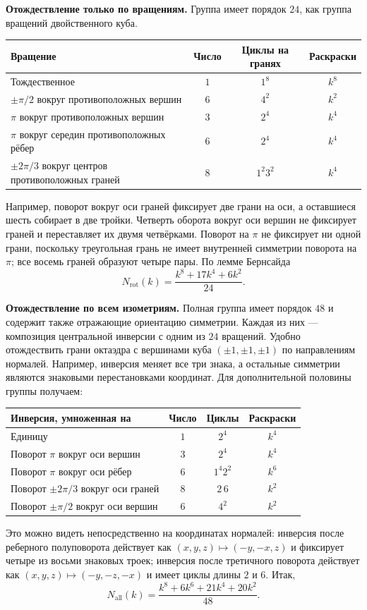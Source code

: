 \textbf{Отождествление только по вращениям.}
Группа имеет порядок $24$, как группа вращений двойственного куба.
\begin{center}
\small\setlength{\tabcolsep}{4pt}
\begin{tabular}{l|c|c|c}
Вращение & Число & Циклы на гранях & Раскраски\\\hline
Тождественное & $1$ & $1^8$ & $k^8$\\
$\pm\pi/2$ вокруг противоположных вершин & $6$ & $4^2$ & $k^2$\\
$\pi$ вокруг противоположных вершин & $3$ & $2^4$ & $k^4$\\
$\pi$ вокруг середин противоположных рёбер & $6$ & $2^4$ & $k^4$\\
$\pm2\pi/3$ вокруг центров противоположных граней & $8$ & $1^2 3^2$ & $k^4$
\end{tabular}
\end{center}
Например, поворот вокруг оси граней фиксирует две грани на оси,
а оставшиеся шесть собирает в две тройки.
Четверть оборота вокруг оси вершин не фиксирует граней и
переставляет их двумя четвёрками.
Поворот на $\pi$ не фиксирует ни одной грани, поскольку
треугольная грань не имеет внутренней симметрии поворота на $\pi$;
все восемь граней образуют четыре пары.
По лемме Бернсайда
\[\boxed{N_{\mathrm{rot}}(k)=\frac{k^8+17k^4+6k^2}{24}.}\]

\textbf{Отождествление по всем изометриям.}
Полная группа имеет порядок $48$ и содержит также отражающие
ориентацию симметрии. Каждая из них --- композиция центральной
инверсии с одним из $24$ вращений.
Удобно отождествить грани октаэдра с вершинами куба
$(\pm1,\pm1,\pm1)$ по направлениям нормалей.
Например, инверсия меняет все три знака, а остальные симметрии
являются знаковыми перестановками координат.
Для дополнительной половины группы получаем:
\begin{center}
\small\setlength{\tabcolsep}{4pt}
\begin{tabular}{l|c|c|c}
Инверсия, умноженная на & Число & Циклы & Раскраски\\\hline
Единицу & $1$ & $2^4$ & $k^4$\\
Поворот $\pi$ вокруг оси вершин & $3$ & $2^4$ & $k^4$\\
Поворот $\pi$ вокруг оси рёбер & $6$ & $1^4 2^2$ & $k^6$\\
Поворот $\pm2\pi/3$ вокруг оси граней & $8$ & $2\,6$ & $k^2$\\
Поворот $\pm\pi/2$ вокруг оси вершин & $6$ & $4^2$ & $k^2$
\end{tabular}
\end{center}
Это можно видеть непосредственно на координатах нормалей:
инверсия после реберного полуповорота действует как
$(x,y,z)\mapsto(-y,-x,z)$ и фиксирует четыре из восьми знаковых
троек; инверсия после третичного поворота действует как
$(x,y,z)\mapsto(-y,-z,-x)$ и имеет циклы длины $2$ и $6$.
Итак,
\[\boxed{N_{\mathrm{all}}(k)=\frac{k^8+6k^6+21k^4+20k^2}{48}.}\]

